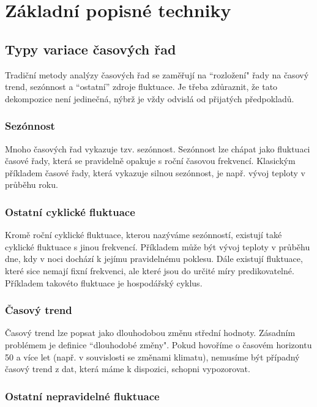 \chapter{Základní popisné techniky}

\section{Typy variace časových řad}

Tradiční metody analýzy časových řad se zaměřují na ``rozložení" řady na časový trend, sezónnost a ``ostatní'' zdroje fluktuace. Je třeba zdůraznit, že tato dekompozice není jedinečná, nýbrž je vždy odvislá od přijatých předpokladů.

\subsection{Sezónnost}

Mnoho časových řad vykazuje tzv. sezónnost. Sezónnost lze chápat jako fluktuaci časové řady, která se pravidelně opakuje s roční časovou frekvencí. Klasickým příkladem časové řady, která vykazuje silnou sezónnost, je např. vývoj teploty v průběhu roku.

\subsection{Ostatní cyklické fluktuace}

Kromě roční cyklické fluktuace, kterou nazýváme sezónností, existují také cyklické fluktuace s jinou frekvencí. Příkladem může být vývoj teploty v průběhu dne, kdy v noci dochází k jejímu pravidelnému poklesu. Dále existují fluktuace, které sice nemají fixní frekvenci, ale které jsou do určité míry predikovatelné. Příkladem takovéto fluktuace je hospodářský cyklus.

\subsection{Časový trend}

Časový trend lze popsat jako dlouhodobou změnu střední hodnoty. Zásadním problémem je definice ``dlouhodobé změny". Pokud hovoříme o časovém horizontu 50 a více let (např. v souvislosti se změnami klimatu), nemusíme být případný časový trend z dat, která máme k dispozici, schopni vypozorovat.

\subsection{Ostatní nepravidelné fluktuace}

